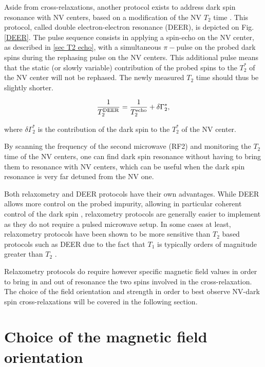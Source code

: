 \documentclass[a4paper, 11pt]{report}
\begin{document}
Aside from cross-relaxations, another protocol exists to address dark spin resonance with NV centers, based on a modification of the NV $T_2$ time \citep{mamin2012detecting, serbyn2014interferometric}. This protocol, called double electron-electron resonance (DEER), is depicted on Fig. \ref{DEER}. The pulse sequence consists in applying a spin-echo on the NV center, as described in \ref{sec T2 echo}, with a simultaneous $\pi-$pulse on the probed dark spins during the rephasing pulse on the NV centers. This additional pulse means that the static (or slowly variable) contribution of the probed spins to the $T_2^*$ of the NV center will not be rephased. The newly measured $T_2$ time should thus be slightly shorter.

\begin{equation}
\frac{1}{T_2^{\rm DEER}}=\frac{1}{T_2^{\rm echo}} + \delta \Gamma_2^*,
\end{equation}

where $\delta \Gamma_2^*$ is the contribution of the dark spin to the $T_2^*$ of the NV center.

By scanning the frequency of the second microwave (RF2) and monitoring the $T_2$ time of the NV centers, one can find dark spin resonance without having to bring them to resonance with NV centers, which can be useful when the dark spin resonance is very far detuned from the NV one.

Both relaxometry and DEER protocols have their own advantages. While DEER allows more control on the probed impurity, allowing in particular coherent control of the dark spin \citep{sushkov2014magnetic}, relaxometry protocols are generally easier to implement as they do not require a pulsed microwave setup. In some cases at least, relaxometry protocols have been shown to be more sensitive than $T_2$ based protocols such as DEER due to the fact that $T_1$ is typically orders of magnitude greater than $T_2$ \citep{steinert2013magnetic}.

Relaxometry protocols do require however specific magnetic field values in order to bring in and out of resonance the two spins involved in the cross-relaxation. The choice of the field orientation and strength in order to best observe NV-dark spin cross-relaxations will be covered in the following section.

\section{Choice of the magnetic field orientation}
\end{document}
